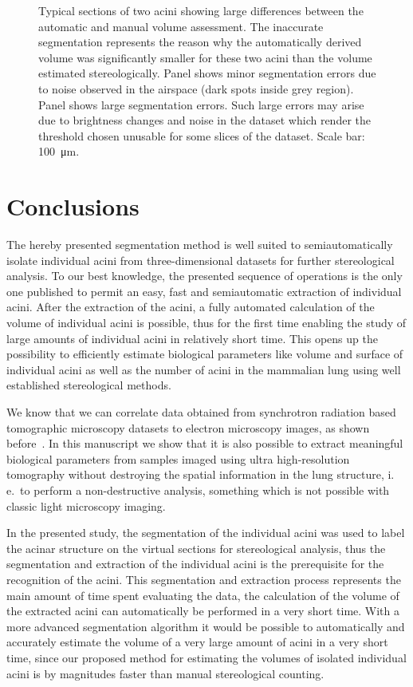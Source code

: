 \documentclass[paper=a4,DIV=calc,abstract,english]{scrartcl}
\newcommand{\ie}{i.\,e.\ }
\begin{document}
\begin{figure}
{		\label{subfig:60e_acinus38}%
	}%
	\hfill%
	\caption{Typical sections of two acini showing large differences between the automatic and manual volume assessment.
		The inaccurate segmentation represents the reason why the automatically derived volume was significantly smaller for these two acini than the volume estimated stereologically.
		Panel \protect{} shows minor segmentation errors due to noise observed in the airspace (dark spots inside grey region).
		Panel \protect{} shows large segmentation errors.
		Such large errors may arise due to brightness changes and noise in the dataset which render the threshold chosen unusable for some slices of the dataset.
		Scale bar: \SI{100}{\micro\meter}.}
	\label{fig:MeVisSegmentation}
\end{figure}

\section{Conclusions}
The hereby presented segmentation method is well suited to semiautomatically isolate individual acini from three-dimensional datasets for further stereological analysis.
To our best knowledge, the presented sequence of operations is the only one published to permit an easy, fast and semiautomatic extraction of individual acini.
After the extraction of the acini, a fully automated calculation of the volume of individual acini is possible, thus for the first time enabling the study of large amounts of individual acini in relatively short time.
This opens up the possibility to efficiently estimate biological parameters like volume and surface of individual acini as well as the number of acini in the mammalian lung using well established stereological methods.

We know that we can correlate data obtained from synchrotron radiation based tomographic microscopy datasets to electron microscopy images, as shown before~\citep{Haberthuer2009}.
In this manuscript we show that it is also possible to extract meaningful biological parameters from samples imaged using ultra high-resolution tomography without destroying the spatial information in the lung structure, \ie to perform a non-destructive analysis, something which is not possible with classic light microscopy imaging.

In the presented study, the segmentation of the individual acini was used to label the acinar structure on the virtual sections for stereological analysis, thus the segmentation and extraction of the individual acini is the prerequisite for the recognition of the acini.
This segmentation and extraction process represents the main amount of time spent evaluating the data, the calculation of the volume of the extracted acini can automatically be performed in a very short time.
With a more advanced segmentation algorithm it would be possible to automatically and accurately estimate the volume of a very large amount of acini in a very short time, since our proposed method for estimating the volumes of isolated individual acini is by magnitudes faster than manual stereological counting.
\end{document}
